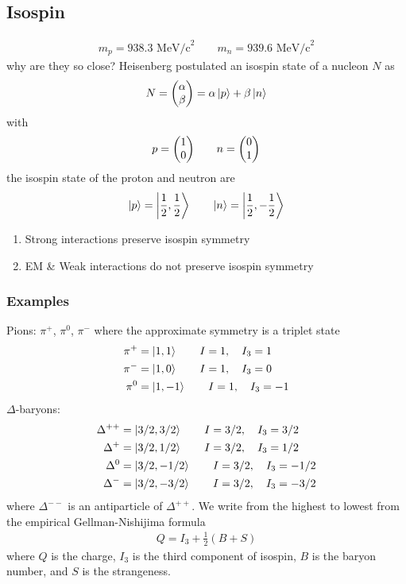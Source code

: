 \documentclass[../main.tex]{subfiles}
\begin{document}
\subsection*{Isospin}
\begin{align*}
    m_p = 938.3 \textrm{ MeV/c}^2 \qquad m_n = 939.6 \textrm{ MeV/c}^2
\end{align*}
why are they so close? Heisenberg postulated an isospin state of a nucleon $N$ as
\begin{align*}
    N = \mqty(\alpha \\ \beta) = \alpha \ket{p} + \beta \ket{n}
\end{align*}
with
\begin{align*}
    p = \mqty(1 \\ 0) \qquad n = \mqty(0 \\ 1)
\end{align*}
the isospin state of the proton and neutron are
\begin{align*}
    \ket{p} = \ket{\frac{1}{2}, \frac{1}{2}} \qquad \ket{n} = \ket{\frac{1}{2}, -\frac{1}{2}}
\end{align*}
\newcommand{\half}{\frac{1}{2}}

\begin{enumerate}
    \item Strong interactions preserve isospin symmetry
    \item EM \& Weak interactions do not preserve isospin symmetry
\end{enumerate}

\subsubsection*{Examples}
Pions: $\pi^+$, $\pi^0$, $\pi^-$ where the approximate symmetry is a triplet state
\begin{align*}
    \pi^+ &= \ket{1, 1} \qquad I = 1, \quad I_3 = 1 \\
    \pi^- &= \ket{1, 0} \qquad I = 1, \quad I_3 = 0 \\ 
    \pi^0 &= \ket{1, -1} \qquad I = 1, \quad I_3 = -1
\end{align*}
$\Delta$-baryons:
\begin{align*}
    \Delta^{++} &= \ket{3/2, 3/2} \qquad I = 3/2, \quad I_3 = 3/2 \\
    \Delta^{+} &= \ket{3/2, 1/2} \qquad I = 3/2, \quad I_3 = 1/2 \\
    \Delta^{0} &= \ket{3/2, -1/2} \qquad I = 3/2, \quad I_3 = -1/2 \\
    \Delta^{-} &= \ket{3/2, -3/2} \qquad I = 3/2, \quad I_3 = -3/2 \\
\end{align*}
where $\Delta^{--}$ is an antiparticle of $\Delta^{++}$. We write from the highest to lowest
from the empirical Gellman-Nishijima formula
\begin{align*}
    Q = I_3 + \frac{1}{2} (B + S)
\end{align*}
where $Q$ is the charge, $I_3$ is the third component of isospin, $B$ is the baryon number, and $S$
is the strangeness.
\end{document}
